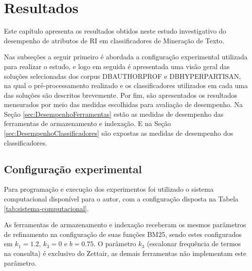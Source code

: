 \chapter{Resultados} \label{ch:Resultados}



	Este capítulo apresenta os resultados obtidos neste estudo investigativo do desempenho de atributos de RI em classificadores de Mineração de Texto.

	Nas subseções a seguir primeiro é abordada a configuração experimental utilizada para realizar o estudo, e logo em seguida é apresentada uma visão geral das soluções selecionadas dos corpus DB\underscore{}AUTHORPROF e DB\underscore{}HYPERPARTISAN, na qual o pré-processamento realizado e os classificadores utilizados em cada uma das soluções são descritos brevemente.
	Por fim, são apresentados os resultados mensurados por meio das medidas escolhidas para avaliação de desempenho.
	Na Seção \ref{sec:DesempenhoFerramentas} estão as medidas de desempenho das ferramentas de armazenamento e indexação.
	E na Seção \ref{sec:DesempenhoClassificadores} são expostas as medidas de desempenho dos classificadores.


	\section{Configuração experimental} \label{sec:ConfiguraçãoExperimental}

		Para programação e execução dos experimentos foi utilizado o sistema computacional disponível para o autor, com a configuração disposta na Tabela \ref{tab:sistema-computacional}.

		
		
		As ferramentas de armazenamento e indexação receberam os mesmos parâmetros de refinamento na configuração de suas funções BM25, sendo estes configurados em $k_1 = 1.2$, $k_3 = 0$ e $b = 0.75$.
		O parâmetro $k_3$ (escalonar frequência de termos na consulta) é exclusivo do Zettair, as demais ferramentas não implementam este parâmetro.

